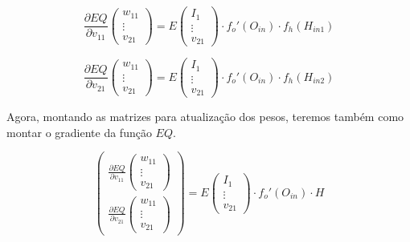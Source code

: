 \documentclass{article}
\begin{document}
$$
    \frac{\partial EQ}{\partial v_{11}}\begin{pmatrix}w_{11}\\\vdots\\v_{21}\end{pmatrix} = E\begin{pmatrix}I_{1}\\ \vdots \\v_{21} \end{pmatrix}\cdot f_o'(O_{in})\cdot f_h(H_{in 1})
$$

$$
    \frac{\partial EQ}{\partial v_{21}}\begin{pmatrix}w_{11}\\\vdots\\v_{21}\end{pmatrix} = E\begin{pmatrix}I_{1}\\ \vdots \\v_{21} \end{pmatrix}\cdot f_o'(O_{in})\cdot f_h(H_{in 2})
$$




Agora, montando as matrizes para atualização dos pesos, teremos também como montar o gradiente da função $EQ$.


$$
\begin{pmatrix} \frac{\partial EQ}{\partial v_{11}}\begin{pmatrix}w_{11}\\\vdots\\v_{21}\end{pmatrix}\\\frac{\partial EQ}{\partial v_{21}}\begin{pmatrix}w_{11}\\\vdots\\v_{21}\end{pmatrix} \end{pmatrix} = E\begin{pmatrix}I_{1}\\ \vdots \\v_{21} \end{pmatrix}\cdot f_o'(O_{in})\cdot H
$$
\end{document}

